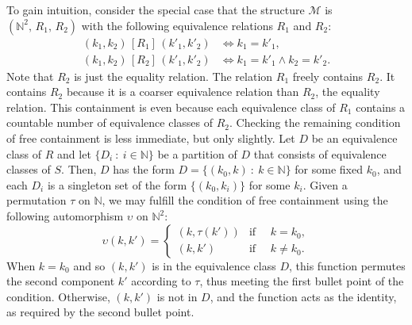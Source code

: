 \documentclass[10pt]{amsart}
\theoremstyle{definition}\newtheorem{defi}[theo]{Definition}\newtheorem{rema}[theo]{Remark}\newtheorem{exam}[theo]{Example}\newtheorem{exem}[theo]{Example}\newtheorem{nota}[theo]{Notation}
\newcommand*\MM{\mathcal{M}}
\begin{document}
To gain intuition, consider the special case that the structure $\MM$ is $(\mathbb{N}^2,\,R_1,\,R_2)$ with the following equivalence relations $R_1$ and $R_2$:
\begin{equation}\label{eqn:example-R12}
\begin{aligned}
(k_1,k_2)\,[R_1]\,(k'_1,k'_2) &\iff k_1 = k'_1,
\\[0.5ex] (k_1,k_2)\,[R_2]\,(k'_1,k'_2) &\iff k_1 = k'_1 \wedge k_2 = k'_2.
\end{aligned}
\end{equation}
Note that $R_2$ is just the equality relation. The relation $R_1$ freely contains $R_2$. It contains $R_2$ because it is a coarser equivalence relation than $R_2$, the equality relation. This containment is even because each equivalence class of $R_1$ contains a countable number of equivalence classes of $R_2$. Checking the remaining condition of free containment is less immediate, but only slightly. Let $D$ be an equivalence class of $R$ and let $\{D_i~:~i \in \mathbb{N}\}$ be a partition of $D$ that consists of equivalence classes of $S$. Then, $D$ has the form $D = \{(k_0,k)~:~k \in \mathbb{N}\}$ for some fixed $k_0$, and each $D_i$ is a singleton set of the form $\{(k_0,k_i)\}$ for some $k_i$. Given a permutation $\tau$ on $\mathbb{N}$, we may fulfill the condition of free containment using the following automorphism $\upsilon$ on $\mathbb{N}^2$:
\[
\upsilon(k,k') =
\begin{cases}
(k,\tau(k')) & \text{if }\quad k = k_0,
\\
(k,k') & \text{if }\quad k \not= k_0.
\end{cases}
\]
When $k=k_0$ and so $(k,k')$ is in the equivalence class $D$, this function permutes the second component $k'$ according to $\tau$, thus meeting the first bullet point of the condition. Otherwise, $(k,k')$ is not in $D$, and the function acts as the identity, as required by the second bullet point.
\end{document}
